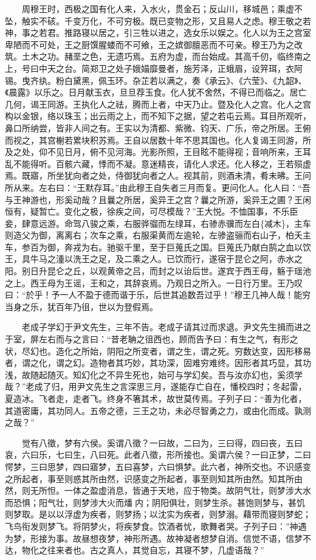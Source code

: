 　　周穆王时，西极之国有化人来，入水火，贯金石；反山川，移城邑；乘虚不坠，触实不硋。千变万化，不可穷极。既已变物之形，又且易人之虑。穆王敬之若神，事之若君。推路寝以居之，引三牲以进之，选女乐以娱之。化人以为王之宫室卑陋而不可处，王之厨馔腥蝼而不可飨，王之嫔御膻恶而不可亲。穆王乃为之改筑。土木之功。赭垩之色，无遗巧焉。五府为虚，而台始成。其高千仞，临终南之上，号曰中天之台。简郑卫之处子娥媌靡曼者，施芳泽，正蛾眉，设笄珥，衣阿锡。曳齐纨。粉白黛黑，佩玉环。杂芷若以满之，奏《承云》、《六莹》、《九韶》、《晨露》以乐之。日月献玉衣，旦旦荐玉食。化人犹不舍然，不得已而临之。居亡几何，谒王同游。王执化人之祛，腾而上者，中天乃止。暨及化人之宫。化人之宫构以金银，络以珠玉；出云雨之上，而不知下之据，望之若屯云焉。耳目所观听，鼻口所纳尝，皆非人间之有。王实以为清都、紫微、钧天、广乐，帝之所居。王俯而视之，其宫榭若累块积苏焉。王自以居数十年不思其国也。化人复谒王同游，所及之处，仰不见日月，俯不见河海。光影所照，王目眩不能得视；音响所来，王耳乱不能得听。百骸六藏，悸而不凝。意迷精丧，请化人求还。化人移之，王若殒虚焉。既寤，所坐犹向者之处，侍御犹向者之人。视其前，则酒未清，肴未昲。王问所从来。左右曰：``王默存耳。''由此穆王自失者三月而复。更问化人。化人曰：``吾与王神游也，形奚动哉？且曩之所居，奚异王之宫？曩之所游，奚异王之圃？王闲恒有，疑暂亡。变化之极，徐疾之间，可尽模哉？''王大悦。不恤国事，不乐臣妾，肆意远游。命驾八骏之乘，右服骅骝而左绿耳，右骖赤骥而左白\{减木\}，主车则造父为御，离离右；次车之乘，右服渠黄而左逾轮，左骖盗骊而右山子，柏夭主车，参百为御，奔戎为右。驰驱千里，至于巨蒐氏之国。巨蒐氏乃献白鹄之血以饮王，具牛马之湩以洗王之足，及二乘之人。已饮而行，遂宿于昆仑之阿，赤水之阳。别日升昆仑之丘，以观黄帝之吕，而封之以诒后世。遂宾于西王母，觞于瑶池之上。西王母为王谣，王和之，其辞哀焉。乃观日之所入。一日行万里。王乃叹曰：``於乎！予一人不盈于德而谐于乐，后世其追数吾过乎！''穆王几神人哉！能穷当身之乐，犹百年乃徂，世以为登假焉。

　　老成子学幻于尹文先生，三年不告。老成子请其过而求退。尹文先生揖而进之于室，屏左右而与之言曰：``昔老聃之徂西也，顾而告予曰：有生之气，有形之状，尽幻也。造化之所始，阴阳之所变者，谓之生，谓之死。穷数达变，因形移易者，谓之化，谓之幻。造物者其巧妙，其功深，固难穷难终。因形者其巧显，其功浅，故随起随灭。知幻化之不异生死也，始可与学幻矣。吾与汝亦幻也，奚须学哉？''老成了归，用尹文先生之言深思三月，遂能存亡自在，憣校四时；冬起雷，夏造冰。飞者走，走者飞。终身不箸其术，故世莫传焉。子列子曰：``善为化者，其道密庸，其功同人。五帝之德，三王之功，未必尽智勇之力，或由化而成。孰测之哉？''

　　觉有八徵，梦有六侯。奚谓八徵？一曰故，二曰为，三曰得，四曰丧，五曰哀，六曰乐，七曰生，八曰死。此者八徵，形所接也。奚谓六侯？一曰正梦，二曰愕梦，三曰思梦，四曰寤梦，五曰喜梦，六曰惧梦。此六者，神所交也。不识感变之所起者，事至则惑其所由然，识感变之所起者，事至则知其所由然。知其所由然，则无所怛。一体之盈虚消息，皆通于天地，应于物类。故阴气壮，则梦涉大水而恐惧；阳气壮，则梦涉大火而燔内；阴阳俱壮，则梦生杀。甚饱则梦与，甚饥则梦取。是以以浮虚为疾者，则梦扬；以沈实为疾者，则梦溺。藉带而寝则梦蛇；飞鸟衔发则梦飞。将阴梦火，将疾梦食。饮酒者忧，歌舞者哭。子列子曰：''神遇为梦，形接为事。故昼想夜梦，神形所遇。故神凝者想梦自消。信觉不语，信梦不达，物化之往来者也。古之真人，其觉自忘，其寝不梦，几虚语哉？''

